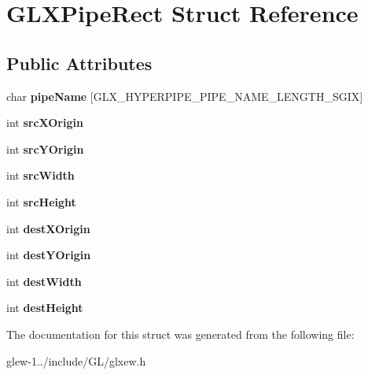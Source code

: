 \hypertarget{struct_g_l_x_pipe_rect}{\section{G\-L\-X\-Pipe\-Rect Struct Reference}
\label{struct_g_l_x_pipe_rect}
}
\subsection*{Public Attributes}
\begin{DoxyCompactItemize}
\item 
\hypertarget{struct_g_l_x_pipe_rect_aa4c4f60e9647705ddefa10f95a37cb79}{char {\bfseries pipe\-Name} \mbox{[}G\-L\-X\-\_\-\-H\-Y\-P\-E\-R\-P\-I\-P\-E\-\_\-\-P\-I\-P\-E\-\_\-\-N\-A\-M\-E\-\_\-\-L\-E\-N\-G\-T\-H\-\_\-\-S\-G\-I\-X\mbox{]}}\label{struct_g_l_x_pipe_rect_aa4c4f60e9647705ddefa10f95a37cb79}

\item 
\hypertarget{struct_g_l_x_pipe_rect_a9df2313c01f75d149e64f2ff467bc266}{int {\bfseries src\-X\-Origin}}\label{struct_g_l_x_pipe_rect_a9df2313c01f75d149e64f2ff467bc266}

\item 
\hypertarget{struct_g_l_x_pipe_rect_a1f7316dff7050ab2ce9d3d37f8c5450e}{int {\bfseries src\-Y\-Origin}}\label{struct_g_l_x_pipe_rect_a1f7316dff7050ab2ce9d3d37f8c5450e}

\item 
\hypertarget{struct_g_l_x_pipe_rect_a2c6c180a4dabb71076366e06a1c7d0ef}{int {\bfseries src\-Width}}\label{struct_g_l_x_pipe_rect_a2c6c180a4dabb71076366e06a1c7d0ef}

\item 
\hypertarget{struct_g_l_x_pipe_rect_a35632524bce6bffa05f284a9b1c1b8ff}{int {\bfseries src\-Height}}\label{struct_g_l_x_pipe_rect_a35632524bce6bffa05f284a9b1c1b8ff}

\item 
\hypertarget{struct_g_l_x_pipe_rect_a8b7b941894ad3420326d7e9fa885bb71}{int {\bfseries dest\-X\-Origin}}\label{struct_g_l_x_pipe_rect_a8b7b941894ad3420326d7e9fa885bb71}

\item 
\hypertarget{struct_g_l_x_pipe_rect_aef7766b02ef07c20a11e89da5878b469}{int {\bfseries dest\-Y\-Origin}}\label{struct_g_l_x_pipe_rect_aef7766b02ef07c20a11e89da5878b469}

\item 
\hypertarget{struct_g_l_x_pipe_rect_a3c07991d2a8fb6e973eae834650b3dad}{int {\bfseries dest\-Width}}\label{struct_g_l_x_pipe_rect_a3c07991d2a8fb6e973eae834650b3dad}

\item 
\hypertarget{struct_g_l_x_pipe_rect_a858b0ea6642e451495aff35cfefbd083}{int {\bfseries dest\-Height}}\label{struct_g_l_x_pipe_rect_a858b0ea6642e451495aff35cfefbd083}

\end{DoxyCompactItemize}


The documentation for this struct was generated from the following file\-:\begin{DoxyCompactItemize}
\item 
glew-\/1../include/\-G\-L/glxew.\-h\end{DoxyCompactItemize}
